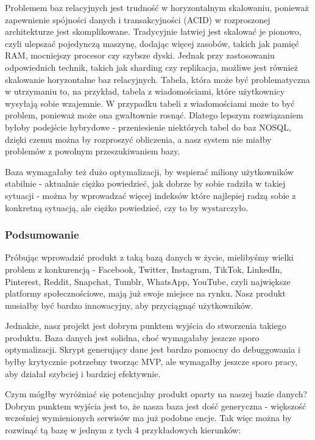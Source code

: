 \documentclass{article}
\begin{document}
Problemem baz relacyjnych jest trudność w horyzontalnym skalowaniu, ponieważ zapewnienie spójności danych i transakcyjności (ACID) w rozproszonej architekturze jest skomplikowane. Tradycyjnie łatwiej jest skalować je pionowo, czyli ulepszać pojedynczą maszynę, dodając więcej zasobów, takich jak pamięć RAM, mocniejszy procesor czy szybsze dyski. Jednak przy zastosowaniu odpowiednich technik, takich jak sharding czy replikacja, możliwe jest również skalowanie horyzontalne baz relacyjnych. Tabela, która może być problematyczna w utrzymaniu to, na przykład, tabela z wiadomościami, które użytkownicy wysyłają sobie wzajemnie.  W przypadku tabeli z wiadomościami może to być problem, ponieważ może ona gwałtownie rosnąć. Dlatego lepszym rozwiązaniem byłoby podejście hybrydowe - przeniesienie niektórych tabel do baz NOSQL, dzięki czemu można by rozproszyć obliczenia, a nasz system nie miałby problemów z powolnym przeszukiwaniem bazy.

Baza wymagałaby też dużo optymalizacji, by wspierać miliony użytkowników stabilnie - aktualnie ciężko powiedzieć, jak dobrze by sobie radziła w takiej sytuacji - można by wprowadzać więcej indeksów które najlepiej radzą sobie z konkretną sytuacją, ale ciężko powiedzieć, czy to by wystarczyło.

\subsubsection{Podsumowanie}

Próbując wprowadzić produkt z taką bazą danych w życie, mielibyśmy wielki problem z konkurencją - Facebook, Twitter, Instagram, TikTok, LinkedIn, Pinterest, Reddit, Snapchat, Tumblr, WhatsApp, YouTube, czyli największe platformy społecznościowe, mają już swoje miejsce na rynku. Nasz produkt musiałby być bardzo innowacyjny, aby przyciągnąć użytkowników. 

Jednakże, nasz projekt jest dobrym punktem wyjścia do stworzenia takiego produktu. Baza danych jest solidna, choć wymagałaby jeszcze sporo optymalizacji. Skrypt generujący dane jest bardzo pomocny do debuggowania i byłby krytycznie potrzebny tworząc MVP, ale wymagałby jeszcze sporo pracy, aby działał szybciej i bardziej efektywnie.

Czym mógłby wyróżniać się potencjalny produkt oparty na naszej bazie danych? Dobrym punktem wyjścia jest to, że nasza baza jest dość generyczna - większość wcześniej wymienionych serwisów ma już podobne encje. Tak więc można by rozwinąć tą bazę w jednym z tych 4 przykładowych kierunków:
\end{document}
